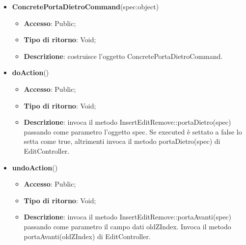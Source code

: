 {{{			
			\begin{itemize}
				\item \textbf{ConcretePortaDietroCommand}(spec:object)
				\begin{itemize}
					\item \textbf{Accesso}: Public;
					\item \textbf{Tipo di ritorno}: Void;
					\item \textbf{Descrizione}: costruisce l’oggetto ConcretePortaDietroCommand.
				\end{itemize}
				\item \textbf{doAction}()
				\begin{itemize}
					\item \textbf{Accesso}: Public;
					\item \textbf{Tipo di ritorno}: Void;
					\item \textbf{Descrizione}: invoca il metodo InsertEditRemove::portaDietro(spec) passando come parametro l'oggetto spec. Se executed è settato a false lo setta come true, altrimenti invoca il metodo portaDietro(spec) di EditController.
				\end{itemize}
				\item \textbf{undoAction}()
				\begin{itemize}
					\item \textbf{Accesso}: Public;
					\item \textbf{Tipo di ritorno}: Void;
					\item \textbf{Descrizione}: invoca il metodo InsertEditRemove::portaAvanti(spec) passando come parametro il campo dati oldZIndex. Invoca il metodo portaAvanti(oldZIndex) di EditController.
				\end{itemize}
			\end{itemize}
	}

	}}
